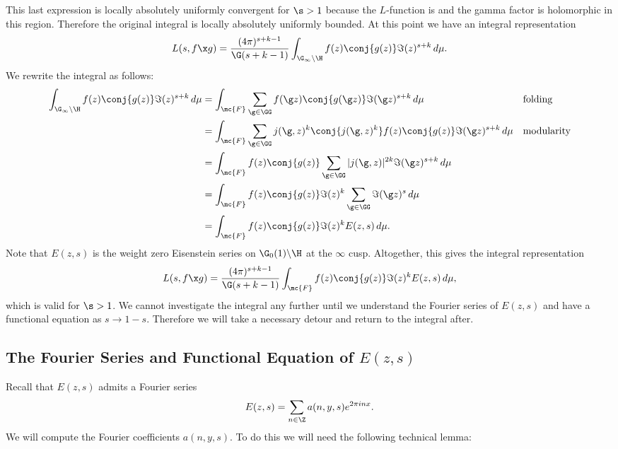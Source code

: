       This last expression is locally absolutely uniformly convergent for $\s > 1$ because the $L$-function is and the gamma factor is holomorphic in this region. Therefore the original integral is locally absolutely uniformly bounded. At this point we have an integral representation
      \[
        L(s,f \x g) = \frac{(4\pi)^{s+k-1}}{\G(s+k-1)}\int_{\G_{\infty}\backslash\H}f(z)\conj{g(z)}\Im(z)^{s+k}\,d\mu.
      \]
      We rewrite the integral as follows:
      \begin{align*}
        \int_{\G_{\infty}\backslash\H}f(z)\conj{g(z)}\Im(z)^{s+k}\,d\mu &= \int_{\mc{F}}\sum_{\g \in \GG}f(\g z)\conj{g(\g z)}\Im(\g z)^{s+k}\,d\mu && \text{folding} \\
        &= \int_{\mc{F}}\sum_{\g \in \GG}j(\g,z)^{k}\conj{j(\g,z)^{k}}f(z)\conj{g(z)}\Im(\g z)^{s+k}\,d\mu && \text{modularity} \\
        &= \int_{\mc{F}}f(z)\conj{g(z)}\sum_{\g \in \GG}|j(\g,z)|^{2k}\Im(\g z)^{s+k}\,d\mu \\
        &= \int_{\mc{F}}f(z)\conj{g(z)}\Im(z)^{k}\sum_{\g \in \GG}\Im(\g z)^{s}\,d\mu \\
        &= \int_{\mc{F}}f(z)\conj{g(z)}\Im(z)^{k}E(z,s)\,d\mu.
      \end{align*}
      Note that $E(z,s)$ is the weight zero Eisenstein series on $\G_{0}(1)\backslash\H$ at the $\infty$ cusp. Altogether, this gives the integral representation
      \begin{equation}\label{equ:Rankin-Selberg_integral-reresentation}
        L(s,f \x g) =  \frac{(4\pi)^{s+k-1}}{\G(s+k-1)}\int_{\mc{F}}f(z)\conj{g(z)}\Im(z)^{k}E(z,s)\,d\mu,
      \end{equation}
      which is valid for $\s > 1$. We cannot investigate the integral any further until we understand the Fourier series of $E(z,s)$ and have a functional equation as $s \to 1-s$. Therefore we will take a necessary detour and return to the integral after.
    \subsection*{The Fourier Series and Functional Equation of \texorpdfstring{$E(z,s)$}{E(z,s)}}
      Recall that $E(z,s)$ admits a Fourier series
      \[
        E(z,s) = \sum_{n \in \Z}a(n,y,s)e^{2\pi inx}.
      \]
      We will compute the Fourier coefficients $a(n,y,s)$. To do this we will need the following technical lemma:

